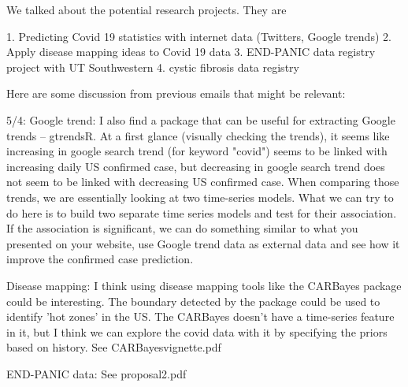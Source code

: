 
We talked about the potential research projects. They are

1. Predicting Covid 19 statistics with internet data (Twitters, Google trends)
2. Apply disease mapping ideas to Covid 19 data
3. END-PANIC data registry project with UT Southwestern
4. cystic fibrosis data registry

Here are some discussion from previous emails that might be relevant:

5/4:
Google trend:
I also find a package that can be useful for extracting Google trends -- gtrendsR.
At a first glance (visually checking the trends),
it seems like increasing in google search trend (for keyword "covid") seems to be linked with increasing daily US confirmed case,
but decreasing in google search trend does not seem to be linked with decreasing US confirmed case.
When comparing those trends, we are essentially looking at two time-series models.
What we can try to do here is to build two separate time series models and test for their association.
If the association is significant, we can do something similar to what you presented on your website, use Google trend data as external data and see how it improve the confirmed case prediction.


Disease mapping:
I think using disease mapping tools like the CARBayes package could be interesting.
The boundary detected by the package could be used to identify 'hot zones' in the US.
The CARBayes doesn't have a time-series feature in it, but I think we can explore the covid data with it by specifying the priors based on history.
See CARBayesvignette.pdf

END-PANIC data:
See proposal2.pdf

